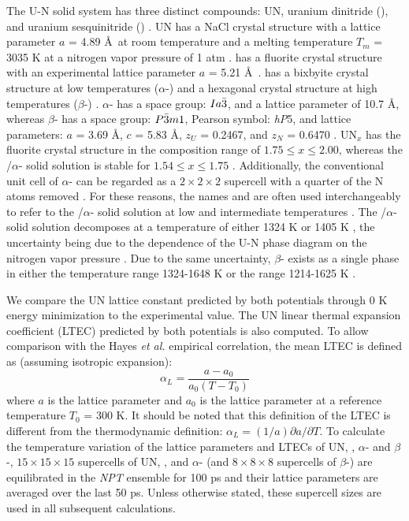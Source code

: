 \documentclass[preprint, 12pt]{elsarticle}
\begin{document}
The U-N solid system has three distinct compounds: UN, uranium dinitride (), and uranium sesquinitride () \cite{Silva2009}. UN has a NaCl crystal structure with a lattice parameter $a$ = 4.89 \AA\ at room temperature \cite{Hayes1990I} and a melting temperature $T_m$ = 3035 K at a nitrogen vapor pressure of 1 atm \cite{Hayes1990IV}.  has a fluorite crystal structure with an experimental lattice parameter $a$ = 5.21 \AA\ \cite{Tagawa1974}.  has a bixbyite crystal structure at low temperatures ($\alpha$-) and a hexagonal crystal structure at high temperatures ($\beta$-) \cite{Uno2020}. $\alpha$- has a space group: $Ia\Bar{3}$, and a lattice parameter of 10.7 \AA, whereas $\beta$- has a space group: $P\Bar{3}m1$, Pearson symbol: \textit{hP}5, and lattice parameters: $a$ = 3.69 \AA, $c$ = 5.83 \AA, $z_U$ = 0.2467, and $z_N$ = 0.6470 \cite{Price1965, Masaki1975}. UN$_x$ has the fluorite crystal structure in the composition range of $1.75 \leq x \leq 2.00$, whereas the /$\alpha$- solid solution is stable for $1.54 \leq x \leq 1.75$ \cite{Silva2009}. Additionally, the conventional unit cell of $\alpha$- can be regarded as a $2 \times 2 \times 2$  supercell with a quarter of the N atoms removed \cite{Weber2017}. For these reasons, the names  and  are often used interchangeably to refer to the /$\alpha$- solid solution at low and intermediate temperatures \cite{Silva2009, Uno2020}. The /$\alpha$- solid solution decomposes at a temperature of either 1324 K \cite{Uno2020} or 1405 K \cite{Okamoto1997}, the uncertainty being due to the dependence of the U-N phase diagram on the nitrogen vapor pressure \cite{Uno2020}. Due to the same uncertainty, $\beta$- exists as a single phase in either the temperature range 1324-1648 K \cite{Uno2020} or the range 1214-1625 K \cite{Okamoto1997}.

We compare the UN lattice constant predicted by both potentials through 0 K energy minimization to the experimental value. The UN linear thermal expansion coefficient (LTEC) predicted by both potentials is also computed. To allow comparison with the Hayes \textit{et al.} \cite{Hayes1990I} empirical correlation, the mean LTEC is defined as (assuming isotropic expansion):
\begin{equation}
\alpha_L = \frac{a - a_0}{a_0 \left( T - T_0 \right)}
\end{equation}
where $a$ is the lattice parameter and $a_0$ is the lattice parameter at a reference temperature $T_0$ = 300 K. It should be noted that this definition of the LTEC is different from the thermodynamic definition: $\alpha_L = (1/a) \partial a / \partial T$. To calculate the temperature variation of the lattice parameters and LTECs of UN, , $\alpha$- and $\beta$-, $15 \times 15 \times 15$ supercells of UN, , and $\alpha$- (and $8 \times 8 \times 8$ supercells of $\beta$-) are equilibrated in the \textit{NPT} ensemble for 100 ps and their lattice parameters are averaged over the last 50 ps. Unless otherwise stated, these supercell sizes are used in all subsequent calculations.
\end{document}
